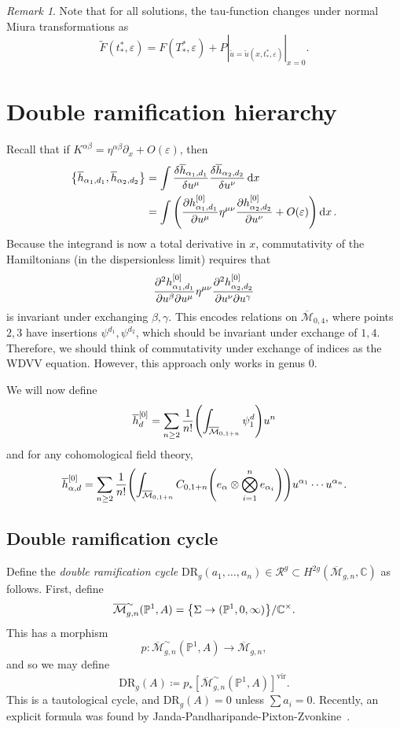 \documentclass[leqno, openany]{memoir}
\theoremstyle{definition}
\theoremstyle{remark}
\newtheorem{rmk}[thm]{Remark}
\theoremstyle{plain}
\theoremstyle{definition}
\theoremstyle{remark}
\newcommand{\C}{\mathbb{C}}
\renewcommand{\P}{\mathbb{P}}
\newcommand{\ep}{\varepsilon}
\newcommand{\mc}[1]{\mathcal{#1}}
\newcommand{\mr}[1]{\mathrm{#1}}
\newcommand{\ol}[1]{\overline{#1}}
\newcommand{\wt}[1]{\widetilde{#1}}
\begin{document}
\begin{rmk}
    Note that for all solutions, the tau-function changes under normal Miura transformations as
    \[ \wt{F}(t_*^*, \ep) = F(T_*^*, \ep) + P|_{\wt{u} = \wt{u}(x, t_*^*, \ep)}|_{x=0}. \]
\end{rmk}


\section{Double ramification hierarchy}

Recall that if $K^{\alpha\beta} = \eta^{\alpha\beta} \partial_x + O(\ep)$, then
\begin{align*}
    \qty{\ol{h}_{\alpha_1, d_1}, \ol{h}_{\alpha_2, d_2}} &= \int \fdv{\ol{h}_{\alpha_1, d_1}}{u^{\mu}} (\eta^{\mu \nu} \partial_x + O(\ep)) \fdv{\ol{h}_{\alpha_2, d_2}}{u^{\nu}} \dd{x} \\
    &= \int \qty(\pdv{h_{\alpha_1, d_1}^{[0]}}{u^{\mu}} \eta^{\mu\nu} \pdv{h_{\alpha_2, d_2}^{[0]}}{u^{\nu}} + O(\ep)) \dd{x}.
\end{align*}
Because the integrand is now a total derivative in $x$, commutativity of the Hamiltonians (in the dispersionless limit) requires that
\[ \pdv{h^{[0]}_{\alpha_1, d_1}}{u^{\beta}}{u^{\mu}} \eta^{\mu \nu} \pdv{h_{\alpha_2, d_2}^{[0]}}{u^{\nu}}{u^{\gamma}} \]
is invariant under exchanging $\beta, \gamma$. This encodes relations on $\ol{\mc{M}}_{0, 4}$, where points $2, 3$ have insertions $\psi^{d_1}, \psi^{d_2}$, which should be invariant under exchange of $1, 4$. Therefore, we should think of commutativity under exchange of indices as the WDVV equation. However, this approach only works in genus $0$.

We will now define
\[ \ol{h}_d^{[0]} = \sum_{n \geq 2} \frac{1}{n!} \qty(\int_{\ol{\mc{M}}_{0,1+n}} \psi_1^d) u^n \]
and for any cohomological field theory,
\[ \ol{h}_{\alpha, d}^{[0]} = \sum_{n \geq 2} \frac{1}{n!} \qty(\int_{\ol{\mc{M}}_{0, 1+n}}C_{0, 1+n}\qty(e_{\alpha} \otimes \bigotimes_{i=1}^n e_{\alpha_i})) u^{\alpha_1} \cdots u^{\alpha_n}. \]

\subsection{Double ramification cycle}

Define the \textit{double ramification cycle} $\mr{DR}_g(a_1, \ldots, a_n) \in \mc{R}^g \subset H^{2g}(\ol{\mc{M}}_{g, n}, \C)$ as follows. First, define
\[ \ol{\mc{M}}_{g, n}^{\sim}(\P^1, A) = \qty{\Sigma \to (\P^1, 0, \infty)} / \C^{\times}. \]
This has a morphism
\[ p \colon \ol{\mc{M}}_{g, n}^{\sim}(\P^1, A) \to \ol{\mc{M}}_{g, n}, \]
and so we may define
\[ \mr{DR}_g(A) \coloneqq p_* [\ol{\mc{M}}_{g, n}^{\sim}(\P^1, A)]^{\mr{vir}}. \]
This is a tautological cycle, and $\mr{DR}_g(A) = 0$ unless $\sum a_i = 0$. Recently, an explicit formula was found by Janda-Pandharipande-Pixton-Zvonkine~\cite{drcycles}.
\end{document}
